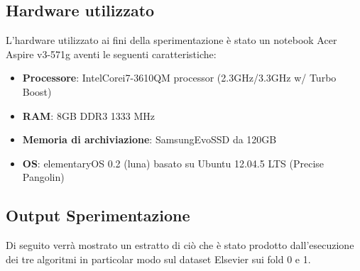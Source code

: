 \subsection{Hardware utilizzato}
\label{hw}
L'hardware utilizzato ai fini della sperimentazione è stato un notebook Acer Aspire v3-571g aventi le seguenti caratteristiche:
\begin{itemize}
	\item \textbf{Processore}: Intel\textregistered Core\texttrademark  i7-3610QM processor (2.3GHz/3.3GHz w/ Turbo Boost)
	\item \textbf{RAM}: 8GB DDR3 1333 MHz
	\item \textbf{Memoria di archiviazione}: Samsung\textregistered Evo\texttrademark SSD da 120GB 
	\item \textbf{OS}: elementaryOS 0.2 (luna) basato su Ubuntu 12.04.5 LTS (Precise Pangolin)
\end{itemize}

\subsection{Output Sperimentazione}
Di seguito verrà mostrato un estratto di ciò che è stato prodotto dall'esecuzione dei tre algoritmi in particolar modo sul dataset Elsevier sui fold 0 e 1.
